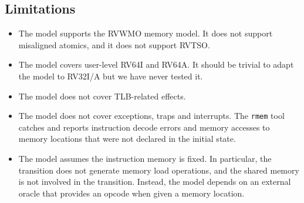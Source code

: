 \subsection{Limitations}\label{sec:omm:limitations}
\begin{itemize}
\item The model supports the RVWMO memory model.
It does not support misaligned atomics, and it does not support RVTSO.
\item The model covers user-level RV64I and RV64A.
It should be trivial to adapt the model to RV32I/A but we have never tested it.
\item The model does not cover TLB-related effects.
\item The model does not cover exceptions, traps and interrupts.
The {\tt rmem} tool catches and reports instruction decode errors and memory accesses to memory locations that were not declared in the initial state.
\item The model assumes the instruction memory is fixed.
In particular, the  transition does not generate memory load operations, and the shared memory is not involved in the transition.
Instead, the model depends on an external oracle that provides an opcode when given a memory location.
\end{itemize}


